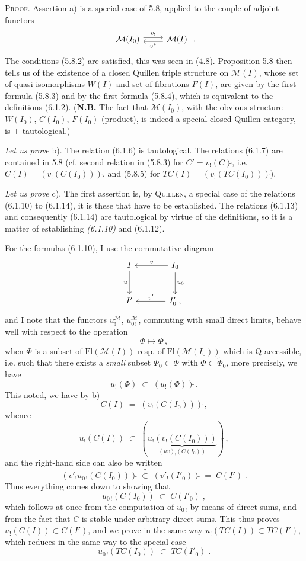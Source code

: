 \documentclass[11pt]{article}
\newcommand{\printedpage}[1]{\marginpar{\footnotesize p.~#1}}
\newcommand{\msp}[1]{\marginpar{\footnotesize [#1]}}
\newcommand{\tl}{\tilde{}}
\newcommand{\Fl}{\mathrm{Fl}}
\begin{document}
\textsc{Proof}. Assertion a) is a special case of 5.8, applied to the couple of adjoint functors
\[
\begin{tikzcd}
\mathcal{M}(I_0) \arrow[r, shift left, "v_!"] & \mathcal{M}(I) \arrow[l, shift left, "v^{*}"]
\end{tikzcd}
\;.
\]
The conditions (5.8.2) are satisfied, this was seen in (4.8). Proposition 5.8 then tells us of the existence of a closed Quillen triple structure on $\mathcal{M}(I)$, whose set of quasi-isomorphisms $W(I)$ and set of fibrations $F(I)$, are given by the first formula (5.8.3) and by the first formula (5.8.4), which is equivalent to the definitions (6.1.2). (\textbf{N.B.} The fact that $\mathcal{M}(I_0)$, with the obvious structure $W(I_0)$, $C(I_0)$, $F(I_0)$ (product), is
\printedpage{51}
\msp{page 102}
indeed a special closed Quillen category, is $\pm$ tautological.)

\textit{Let us prove} b). The relation (6.1.6) is tautological. The relations (6.1.7) are contained in 5.8 (cf. second relation in (5.8.3) for $C' = v_!(C)\tl$, i.e. $C(I) = (v_!(C(I_0)))\tl$, and (5.8.5) for $TC(I) = (v_!(TC(I_0)))\tl$).

\textit{Let us prove} c). The first assertion is, by \textsc{Quillen}, a special case of the relations (6.1.10) to (6.1.14), it is these that have to be established. The relations (6.1.13) and consequently (6.1.14) are tautological by virtue of the definitions, so it is a matter of establishing \textit{(6.1.10)} and (6.1.12).

For the formulas (6.1.10), I use the commutative diagram
\[
\begin{tikzcd}[row sep=large, column sep=large]
I \arrow[d, "u"'] & I_0 \arrow[l, "v"'] \arrow[d, "u_0"] \\
I' & I'_0\;, \arrow[l, "v'"']
\end{tikzcd}
\]
and I note that the functors $u_!^{\mathcal{M}}$, $u_{0\,!}^{\mathcal{M}}$, commuting with small direct limits,
\msp{page 103}
behave well with respect to the operation
\[
\Phi \longmapsto \Phi\tl\,,
\]
when $\Phi$ is a subset of $\Fl(\mathcal{M}(I))$ resp. of $\Fl(\mathcal{M}(I_0))$ which is Q-accessible, i.e. such that there exists a \textit{small} subset $\Phi_0 \subset \Phi$ with $\Phi \subset \tilde{\Phi}_0$, more precisely, we have
\[
u_!(\Phi\tl) \;\subset\; (u_!(\Phi))\tl\,.
\]
This noted, we have by b)
\[
C(I) \;=\; (v_!(C(I_0)))\tl\,,
\]
whence
\[
u_!(C(I)) \;\subset\; (\underbrace{u_!(v_!(C(I_0)))}_{(uv)_!(C(I_0))})\tl\,,
\]
and the right-hand side can also be written
\[
(v'_!u_{0\,!}(C(I_0)))\tl \;\overset{?}{\subset}\; (v'_!(I'_0))\tl \;=\; C(I')\;. %
\]
Thus everything comes down to showing that
\[
u_{0\,!}(C(I_0)) \;\subset\; C(I'_0)\;,
\tag*{(6.1.16)}
\]
which follows at once from the computation of $u_{0\,!}$ by means of direct sums, and from the fact that $C$ is stable under arbitrary direct sums. This thus proves $u_!(C(I)) \subset C(I')$, and we prove in the same way $u_!(TC(I)) \subset TC(I')$, which reduces in the same way to the special case
\[
u_{0\,!}(TC(I_0)) \;\subset\; TC(I'_0)\;.
\tag*{(6.1.17)}
\]
\end{document}
